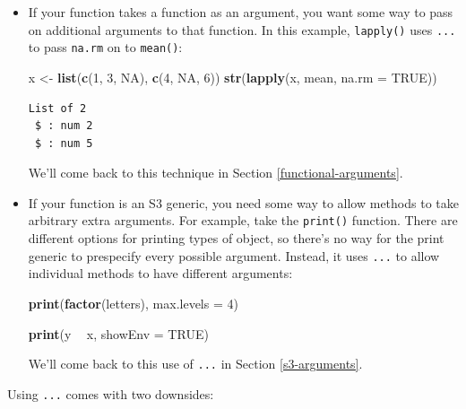 \documentclass[]{book}
\newenvironment{Shaded}{\begin{snugshade}}{\end{snugshade}}
\newcommand{\DataTypeTok}[1]{\textcolor[rgb]{0.13,0.29,0.53}{#1}}
\newcommand{\DecValTok}[1]{\textcolor[rgb]{0.00,0.00,0.81}{#1}}
\newcommand{\KeywordTok}[1]{\textcolor[rgb]{0.13,0.29,0.53}{\textbf{#1}}}
\newcommand{\NormalTok}[1]{#1}
\newcommand{\OperatorTok}[1]{\textcolor[rgb]{0.81,0.36,0.00}{\textbf{#1}}}
\newcommand{\OtherTok}[1]{\textcolor[rgb]{0.56,0.35,0.01}{#1}}
\newcommand{\StringTok}[1]{\textcolor[rgb]{0.31,0.60,0.02}{#1}}
\theoremstyle{definition}
\theoremstyle{definition}
\theoremstyle{definition}
\theoremstyle{remark}
\begin{document}
\begin{itemize}
\item
  If your function takes a function as an argument, you want some way to
  pass on additional arguments to that function. In this example,
  \texttt{lapply()} uses \texttt{...} to pass \texttt{na.rm} on to
  \texttt{mean()}:

\begin{Shaded}
\begin{Highlighting}[]
\NormalTok{x <-}\StringTok{ }\KeywordTok{list}\NormalTok{(}\KeywordTok{c}\NormalTok{(}\DecValTok{1}\NormalTok{, }\DecValTok{3}\NormalTok{, }\OtherTok{NA}\NormalTok{), }\KeywordTok{c}\NormalTok{(}\DecValTok{4}\NormalTok{, }\OtherTok{NA}\NormalTok{, }\DecValTok{6}\NormalTok{))}
\KeywordTok{str}\NormalTok{(}\KeywordTok{lapply}\NormalTok{(x, mean, }\DataTypeTok{na.rm =} \OtherTok{TRUE}\NormalTok{))}
\end{Highlighting}
\end{Shaded}

\begin{verbatim}
List of 2
 $ : num 2
 $ : num 5
\end{verbatim}

  We'll come back to this technique in Section
  \ref{functional-arguments}.
\item
  If your function is an S3 generic, you need some way to allow methods
  to take arbitrary extra arguments. For example, take the
  \texttt{print()} function. There are different options for printing
  types of object, so there's no way for the print generic to prespecify
  every possible argument. Instead, it uses \texttt{...} to allow
  individual methods to have different arguments:

\begin{Shaded}
\begin{Highlighting}[]
\KeywordTok{print}\NormalTok{(}\KeywordTok{factor}\NormalTok{(letters), }\DataTypeTok{max.levels =} \DecValTok{4}\NormalTok{)}

\KeywordTok{print}\NormalTok{(y }\OperatorTok{~}\StringTok{ }\NormalTok{x, }\DataTypeTok{showEnv =} \OtherTok{TRUE}\NormalTok{)}
\end{Highlighting}
\end{Shaded}

  We'll come back to this use of \texttt{...} in Section
  \ref{s3-arguments}.
\end{itemize}

Using \texttt{...} comes with two downsides:
\end{document}
